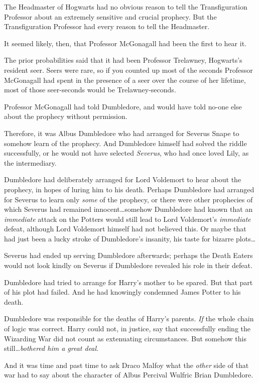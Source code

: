 The Headmaster of Hogwarts had no obvious reason to tell the Transfiguration Professor about an extremely sensitive and crucial prophecy. But the Transfiguration Professor had every reason to tell the Headmaster.

It seemed likely, then, that Professor McGonagall had been the first to hear it.

The prior probabilities said that it had been Professor Trelawney, Hogwarts's resident seer. Seers were rare, so if you counted up most of the seconds Professor McGonagall had spent in the presence of a seer over the course of her lifetime, most of those seer-seconds would be Trelawney-seconds.

Professor McGonagall had told Dumbledore, and would have told no-one else about the prophecy without permission.

Therefore, it was Albus Dumbledore who had arranged for Severus Snape to somehow learn of the prophecy. And Dumbledore himself had solved the riddle successfully, or he would not have selected \emph{Severus}, who had once loved Lily, as the intermediary.

Dumbledore had deliberately arranged for Lord Voldemort to hear about the prophecy, in hopes of luring him to his death. Perhaps Dumbledore had arranged for Severus to learn only \emph{some} of the prophecy, or there were other prophecies of which Severus had remained innocent…somehow Dumbledore had known that an \emph{immediate} attack on the Potters would still lead to Lord Voldemort's \emph{immediate} defeat, although Lord Voldemort himself had not believed this. Or maybe that had just been a lucky stroke of Dumbledore's insanity, his taste for bizarre plots…

Severus had ended up serving Dumbledore afterwards; perhaps the Death Eaters would not look kindly on Severus if Dumbledore revealed his role in their defeat.

Dumbledore had tried to arrange for Harry's mother to be spared. But that part of his plot had failed. And he had knowingly condemned James Potter to his death.

Dumbledore was responsible for the deaths of Harry's parents. \emph{If} the whole chain of logic was correct. Harry could not, in justice, say that successfully ending the Wizarding War did not count as extenuating circumstances. But somehow this still…\emph{bothered him a great deal}.

And it was time and past time to ask Draco Malfoy what the \emph{other} side of that war had to say about the character of Albus Percival Wulfric Brian Dumbledore.

